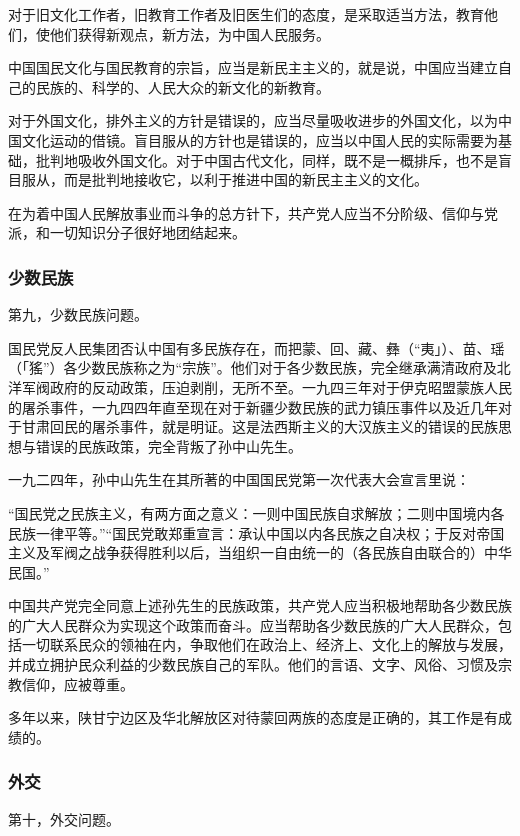 对于旧文化工作者，旧教育工作者及旧医生们的态度，是采取适当方法，教育他们，使他们获得新观点，新方法，为中国人民服务。

中国国民文化与国民教育的宗旨，应当是新民主主义的，就是说，中国应当建立自己的民族的、科学的、人民大众的新文化的新教育。

对于外国文化，排外主义的方针是错误的，应当尽量吸收进步的外国文化，以为中国文化运动的借镜。盲目服从的方针也是错误的，应当以中国人民的实际需要为基础，批判地吸收外国文化。对于中国古代文化，同样，既不是一概排斥，也不是盲目服从，而是批判地接收它，以利于推进中国的新民主主义的文化。

在为着中国人民解放事业而斗争的总方针下，共产党人应当不分阶级、信仰与党派，和一切知识分子很好地团结起来。

\subsubsection{少数民族}

第九，少数民族问题。

国民党反人民集团否认中国有多民族存在，而把蒙、回、藏、彝（“夷」）、苗、瑶（「猺”）各少数民族称之为“宗族”。他们对于各少数民族，完全继承满清政府及北洋军阀政府的反动政策，压迫剥削，无所不至。一九四三年对于伊克昭盟蒙族人民的屠杀事件，一九四四年直至现在对于新疆少数民族的武力镇压事件以及近几年对于甘肃回民的屠杀事件，就是明证。这是法西斯主义的大汉族主义的错误的民族思想与错误的民族政策，完全背叛了孙中山先生。

一九二四年，孙中山先生在其所著的中国国民党第一次代表大会宣言里说：

“国民党之民族主义，有两方面之意义：一则中国民族自求解放；二则中国境内各民族一律平等。”“国民党敢郑重宣言：承认中国以内各民族之自决权；于反对帝国主义及军阀之战争获得胜利以后，当组织一自由统一的（各民族自由联合的）中华民国。”

中国共产党完全同意上述孙先生的民族政策，共产党人应当积极地帮助各少数民族的广大人民群众为实现这个政策而奋斗。应当帮助各少数民族的广大人民群众，包括一切联系民众的领袖在内，争取他们在政治上、经济上、文化上的解放与发展，并成立拥护民众利益的少数民族自己的军队。他们的言语、文字、风俗、习惯及宗教信仰，应被尊重。

多年以来，陕甘宁边区及华北解放区对待蒙回两族的态度是正确的，其工作是有成绩的。

\subsubsection{外交}

第十，外交问题。

